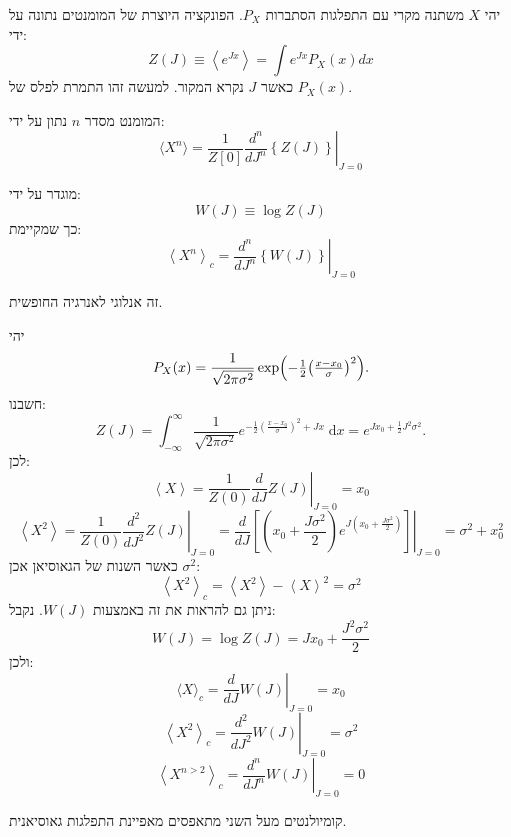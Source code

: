 \documentclass{tstextbook}
\begin{document}
\begin{definition}
יהי \(X\) משתנה מקרי עם התפלגות הסתברות \(P_{X}\). הפונקציה היוצרת של המומנטים נתונה על ידי:
$$Z\left(J\right)\equiv\left\langle e^{J x}\right\rangle=\int e^{J x}P_{X}\left(x\right)d x$$
כאשר \(J\) נקרא המקור. למעשה זהו התמרת לפלס של \(P_{X}(x)\). 

\end{definition}
\begin{proposition}
המומנט מסדר \(n\) נתון על ידי:
$$\langle X^{n}\rangle=\frac{1}{Z\left[0\right]}\left.\frac{d^{n}}{d J^{n}}\left\{Z\left(J\right)\right\}\right|_{J=0}$$

\end{proposition}
\begin{definition}
מוגדר על ידי:
$$W\left(J\right)\equiv\log Z\left(J\right)$$
כך שמקיימת:
$$\left\langle X^{n}\right\rangle_{c}=\left.{\frac{d^{n}}{d J^{n}}}\left\{W\left(J\right)\right\}\right|_{J=0}$$

\end{definition}
\begin{remark}
זה אנלוגי לאנרגיה החופשית.

\end{remark}
\begin{example}
יהי
$$P_X(x) = \frac{1}{\sqrt{2\pi\sigma^2}} \exp\Bigl(-\tfrac{1}{2}\bigl(\tfrac{x-x_0}{\sigma}\bigr)^2\Bigr).
$$
חשבנו:
$$Z(J) = \int_{-\infty}^{\infty} \frac{1}{\sqrt{2\pi\sigma^2}} e^{ - \tfrac{1}{2}(\frac{x-x_0}{\sigma})^2 + Jx }\;\mathrm{d}x= e^{ J x_0 + \tfrac{1}{2}J^2\sigma^2 }.
$$
לכן:
$$\left\langle X\right\rangle=\frac{1}{Z\left(0\right)}\left.\frac{d}{d J}Z\left(J\right)\right|_{J=0}=x_{0}$$$$\left\langle X^{2}\right\rangle=\frac{1}{Z\left(0\right)}\left.\frac{d^{2}}{d J^{2}}Z\left(J\right)\right|_{J=0}=\left.\frac{d}{d J}\left[\left(x_{0}+\frac{J\sigma^{2}}{2}\right)e^{J\left(x_{0}+\frac{J\sigma^{2}}{2}\right)}\right]\right|_{J=0}=\sigma^{2}+x_{0}^{2}$$
כאשר השנות של הגאוסיאן אכן \(\sigma^{2}\):
$$\left\langle X^{2}\right\rangle_{c}=\left\langle X^{2}\right\rangle-\left\langle X\right\rangle^{2}=\sigma^{2}$$
ניתן גם להראות את זה באמצעות \(W(J)\). נקבל:
$$W\left(J\right)=\log Z\left(J\right)=J x_{0}+{\frac{J^{2}\sigma^{2}}{2}}$$
ולכן:
$$\langle X\rangle_{c}=\left.\frac{d}{d J}W\left(J\right)\right|_{J=0}=x_{0}$$$$\left\langle X^{2}\right\rangle_{c}=\left.\frac{d^{2}}{d J^{2}}W\left(J\right)\right|_{J=0}=\sigma^{2}$$$$\left\langle X^{n>2}\right\rangle_{c}=\left.\frac{d^{n}}{d J^{n}}W\left(J\right)\right|_{J=0}=0$$

\end{example}
\begin{remark}
קומיולנטים מעל השני מתאפסים מאפיינת התפלגות גאוסיאנית.

\end{remark}
\end{document}
